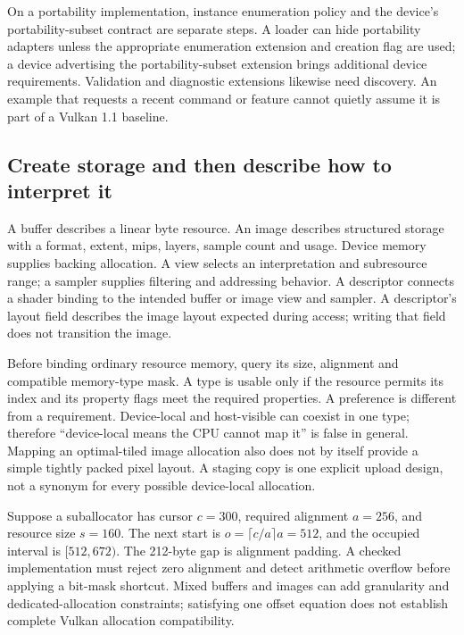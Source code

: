 On a portability implementation, instance enumeration policy and the device's portability-subset contract are separate steps. A loader can hide portability adapters unless the appropriate enumeration extension and creation flag are used; a device advertising the portability-subset extension brings additional device requirements. Validation and diagnostic extensions likewise need discovery. An example that requests a recent command or feature cannot quietly assume it is part of a Vulkan 1.1 baseline.

\subsection{Create storage and then describe how to interpret it}\label{01-foundations-i-ch011-create-storage-and-then-describe-how-to-interpret-it}

\hypertarget{01-foundations-i-ch011-create-storage-and-then-describe-how-to-interpret-it}{}

A buffer describes a linear byte resource. An image describes structured storage with a format, extent, mips, layers, sample count and usage. Device memory supplies backing allocation. A view selects an interpretation and subresource range; a sampler supplies filtering and addressing behavior. A descriptor connects a shader binding to the intended buffer or image view and sampler. A descriptor's layout field describes the image layout expected during access; writing that field does not transition the image.

Before binding ordinary resource memory, query its size, alignment and compatible memory-type mask. A type is usable only if the resource permits its index and its property flags meet the required properties. A preference is different from a requirement. Device-local and host-visible can coexist in one type; therefore ``device-local means the CPU cannot map it'' is false in general. Mapping an optimal-tiled image allocation also does not by itself provide a simple tightly packed pixel layout. A staging copy is one explicit upload design, not a synonym for every possible device-local allocation.

Suppose a suballocator has cursor \(c=300\), required alignment \(a=256\), and resource size \(s=160\). The next start is \(o=\lceil c/a\rceil a=512\), and the occupied interval is \([512,672)\). The 212-byte gap is alignment padding. A checked implementation must reject zero alignment and detect arithmetic overflow before applying a bit-mask shortcut. Mixed buffers and images can add granularity and dedicated-allocation constraints; satisfying one offset equation does not establish complete Vulkan allocation compatibility.

